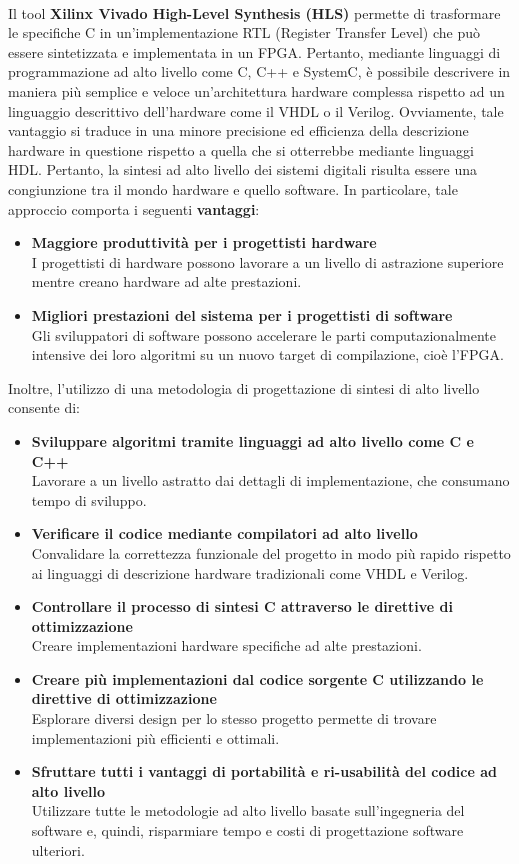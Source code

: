 Il tool \textbf{Xilinx\textsuperscript{\textregistered} Vivado\textsuperscript{\textregistered} High-Level Synthesis (HLS)} permette di trasformare le specifiche C in un'implementazione RTL (Register Transfer Level) che può essere sintetizzata e implementata in un FPGA. Pertanto, mediante linguaggi di programmazione ad alto livello come C, C++ e SystemC, è possibile descrivere in maniera più semplice e veloce un'architettura hardware complessa rispetto ad un linguaggio descrittivo dell'hardware come il VHDL o il Verilog. Ovviamente, tale vantaggio si traduce in una minore precisione ed efficienza della descrizione hardware in questione rispetto a quella che si otterrebbe mediante linguaggi HDL. Pertanto, la sintesi ad alto livello dei sistemi digitali risulta essere una congiunzione tra il mondo hardware e quello software. In particolare, tale approccio comporta i seguenti \textbf{vantaggi}:
\begin{itemize}
    \item \textbf{Maggiore produttività per i progettisti hardware}\\
    I progettisti di hardware possono lavorare a un livello di astrazione superiore mentre creano hardware ad alte prestazioni.
    \item \textbf{Migliori prestazioni del sistema per i progettisti di software}\\
    Gli sviluppatori di software possono accelerare le parti computazionalmente intensive dei loro algoritmi su un nuovo target di compilazione, cioè l'FPGA.
\end{itemize}
Inoltre, l'utilizzo di una metodologia di progettazione di sintesi di alto livello consente di:
\begin{itemize}
    \item \textbf{Sviluppare algoritmi tramite linguaggi ad alto livello come C e C++}\\
    Lavorare a un livello astratto dai dettagli di implementazione, che consumano tempo di sviluppo.
    \item \textbf{Verificare il codice mediante compilatori ad alto livello}\\
    Convalidare la correttezza funzionale del progetto in modo più rapido rispetto ai linguaggi di descrizione hardware tradizionali come VHDL e Verilog.
    \item \textbf{Controllare il processo di sintesi C attraverso le direttive di ottimizzazione}\\
    Creare implementazioni hardware specifiche ad alte prestazioni.
    \item \textbf{Creare più implementazioni dal codice sorgente C utilizzando le direttive di ottimizzazione}\\
    Esplorare diversi design per lo stesso progetto permette di trovare implementazioni più efficienti e ottimali.
    \item \textbf{Sfruttare tutti i vantaggi di portabilità e ri-usabilità del codice ad alto livello}\\
    Utilizzare tutte le metodologie ad alto livello basate sull'ingegneria del software e, quindi, risparmiare tempo e costi di progettazione software ulteriori.
\end{itemize}
